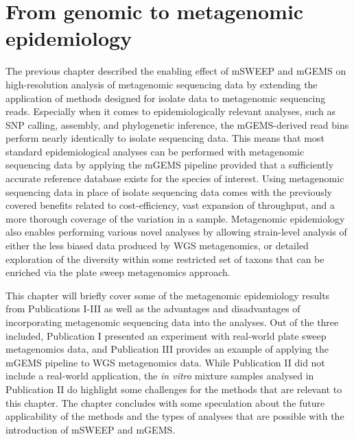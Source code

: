 \documentclass[officiallayout]{tktla}
\begin{document}
\section{From genomic to metagenomic epidemiology}

The previous chapter described the enabling effect of mSWEEP and mGEMS
on high-resolution analysis of metagenomic sequencing data by
extending the application of methods designed for isolate data to
metagenomic sequencing reads. Especially when it comes to
epidemiologically relevant analyses, such as SNP calling, assembly,
and phylogenetic inference, the mGEMS-derived read bins perform nearly
identically to isolate sequencing data. This means that most standard
epidemiological analyses can be performed with metagenomic sequencing
data by applying the mGEMS pipeline \textemdash{ } provided that a
sufficiently accurate reference database exists for the species of
interest. Using metagenomic sequencing data in place of isolate
sequencing data comes with the previously covered benefits related to
cost-efficiency, vast expansion of throughput, and a more thorough
coverage of the variation in a sample. Metagenomic epidemiology also
enables performing various novel analyses by allowing strain-level
analysis of either the less biased data produced by WGS metagenomics,
or detailed exploration of the diversity within some restricted set of
taxons that can be enriched via the plate sweep metagenomics approach.

This chapter will briefly cover some of the metagenomic epidemiology
results from Publications I-III as well as the advantages and
disadvantages of incorporating metagenomic sequencing data into the
analyses. Out of the three included, Publication I presented an
experiment with real-world plate sweep metagenomics data, and
Publication III provides an example of applying the mGEMS pipeline to
WGS metagenomics data. While Publication II did not include a
real-world application, the \textit{in vitro} mixture samples analysed
in Publication II do highlight some challenges for the methods that are
relevant to this chapter. The chapter concludes with some speculation
about the future applicability of the methods and the types of
analyses that are possible with the introduction of mSWEEP and mGEMS.
\end{document}
